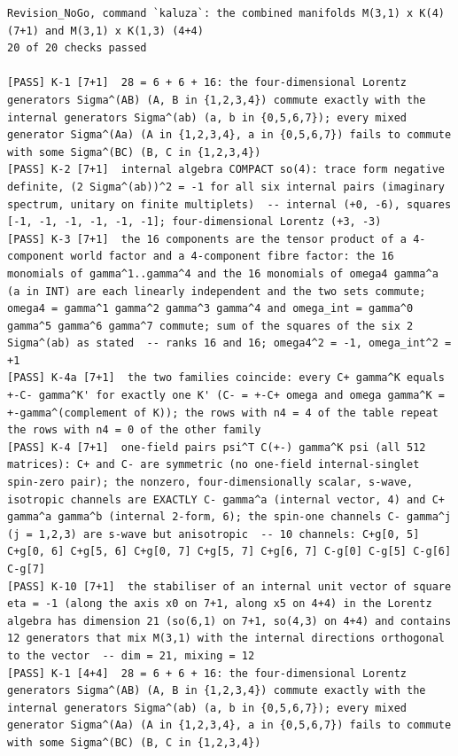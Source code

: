 \documentclass[
  10pt,
]{article}
\begin{document}
\begin{verbatim}
Revision_NoGo, command `kaluza`: the combined manifolds M(3,1) x K(4) (7+1) and M(3,1) x K(1,3) (4+4)
20 of 20 checks passed

[PASS] K-1 [7+1]  28 = 6 + 6 + 16: the four-dimensional Lorentz generators Sigma^(AB) (A, B in {1,2,3,4}) commute exactly with the internal generators Sigma^(ab) (a, b in {0,5,6,7}); every mixed generator Sigma^(Aa) (A in {1,2,3,4}, a in {0,5,6,7}) fails to commute with some Sigma^(BC) (B, C in {1,2,3,4})
[PASS] K-2 [7+1]  internal algebra COMPACT so(4): trace form negative definite, (2 Sigma^(ab))^2 = -1 for all six internal pairs (imaginary spectrum, unitary on finite multiplets)  -- internal (+0, -6), squares [-1, -1, -1, -1, -1, -1]; four-dimensional Lorentz (+3, -3)
[PASS] K-3 [7+1]  the 16 components are the tensor product of a 4-component world factor and a 4-component fibre factor: the 16 monomials of gamma^1..gamma^4 and the 16 monomials of omega4 gamma^a (a in INT) are each linearly independent and the two sets commute; omega4 = gamma^1 gamma^2 gamma^3 gamma^4 and omega_int = gamma^0 gamma^5 gamma^6 gamma^7 commute; sum of the squares of the six 2 Sigma^(ab) as stated  -- ranks 16 and 16; omega4^2 = -1, omega_int^2 = +1
[PASS] K-4a [7+1]  the two families coincide: every C+ gamma^K equals +-C- gamma^K' for exactly one K' (C- = +-C+ omega and omega gamma^K = +-gamma^(complement of K)); the rows with n4 = 4 of the table repeat the rows with n4 = 0 of the other family
[PASS] K-4 [7+1]  one-field pairs psi^T C(+-) gamma^K psi (all 512 matrices): C+ and C- are symmetric (no one-field internal-singlet spin-zero pair); the nonzero, four-dimensionally scalar, s-wave, isotropic channels are EXACTLY C- gamma^a (internal vector, 4) and C+ gamma^a gamma^b (internal 2-form, 6); the spin-one channels C- gamma^j (j = 1,2,3) are s-wave but anisotropic  -- 10 channels: C+g[0, 5] C+g[0, 6] C+g[5, 6] C+g[0, 7] C+g[5, 7] C+g[6, 7] C-g[0] C-g[5] C-g[6] C-g[7]
[PASS] K-10 [7+1]  the stabiliser of an internal unit vector of square eta = -1 (along the axis x0 on 7+1, along x5 on 4+4) in the Lorentz algebra has dimension 21 (so(6,1) on 7+1, so(4,3) on 4+4) and contains 12 generators that mix M(3,1) with the internal directions orthogonal to the vector  -- dim = 21, mixing = 12
[PASS] K-1 [4+4]  28 = 6 + 6 + 16: the four-dimensional Lorentz generators Sigma^(AB) (A, B in {1,2,3,4}) commute exactly with the internal generators Sigma^(ab) (a, b in {0,5,6,7}); every mixed generator Sigma^(Aa) (A in {1,2,3,4}, a in {0,5,6,7}) fails to commute with some Sigma^(BC) (B, C in {1,2,3,4})

\end{verbatim}
\end{document}
